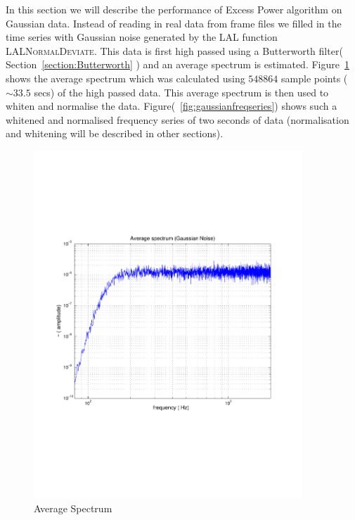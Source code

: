 In this section we will describe the performance of Excess Power algorithm  
on Gaussian data.  Instead of reading in real data from frame files we filled 
in the time series with Gaussian noise generated by the LAL 
function \textsc{LALNormalDeviate}.  This data is first high passed using
a Butterworth filter( Section~\ref{section:Butterworth} ) and an 
average spectrum is estimated.  Figure~\ref{fig:gaussianspectrum} shows the 
average spectrum which was calculated using $548864$ sample points
($\sim 33.5$ secs) of the high passed data.  This average spectrum is then 
used to whiten and normalise the data.   Figure(~\ref{fig:gaussianfreqseries}) 
shows such a whitened and normalised frequency series of two seconds of data 
(normalisation and whitening will be described in other sections).
\begin{figure}[h]
\begin{center}
\includegraphics[width=0.9\textwidth]{figures/averagespec_psd}
\caption{Average Spectrum}
\label{fig:gaussianspectrum}
\end{center}
\end{figure}

